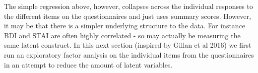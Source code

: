 \documentclass[]{article}
\newenvironment{Shaded}{\begin{snugshade}}{\end{snugshade}}
\newcommand{\KeywordTok}[1]{\textcolor[rgb]{0.13,0.29,0.53}{\textbf{#1}}}
\newcommand{\DataTypeTok}[1]{\textcolor[rgb]{0.13,0.29,0.53}{#1}}
\newcommand{\DecValTok}[1]{\textcolor[rgb]{0.00,0.00,0.81}{#1}}
\newcommand{\StringTok}[1]{\textcolor[rgb]{0.31,0.60,0.02}{#1}}
\newcommand{\CommentTok}[1]{\textcolor[rgb]{0.56,0.35,0.01}{\textit{#1}}}
\newcommand{\OtherTok}[1]{\textcolor[rgb]{0.56,0.35,0.01}{#1}}
\newcommand{\OperatorTok}[1]{\textcolor[rgb]{0.81,0.36,0.00}{\textbf{#1}}}
\newcommand{\NormalTok}[1]{#1}
\begin{document}
The simple regression above, however, collapses across the individual
responses to the different items on the questionnaires and just uses
summary scores. However, it may be that there is a simpler underlying
structure to the data. For instance BDI and STAI are often highly
correlated - so may actually be measuring the same latent construct. In
this next section (inspired by Gillan et al 2016) we first run an
exploratory factor analysis on the individual items from the
questionnaires in an attempt to reduce the amount of latent variables.

\begin{Shaded}
\end{Shaded}
\end{document}
